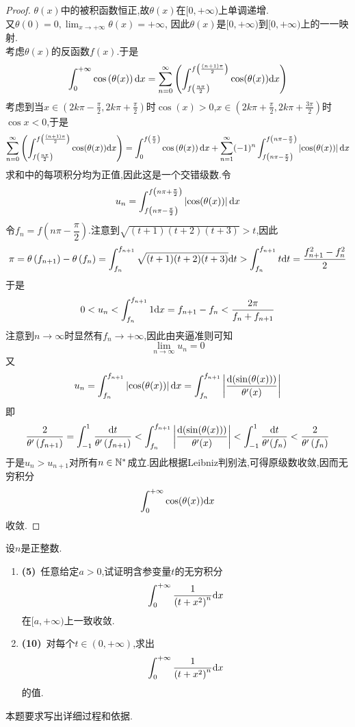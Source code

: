 \documentclass{ctexart}
\begin{document}
\begin{proof}
    $\theta(x)$中的被积函数恒正,故$\theta(x)$在$[0,+\infty)$上单调递增.\\
    又$\theta(0)=0,\displaystyle\lim_{x\to+\infty}\theta(x)=+\infty$,%
    因此$\theta(x)$是$[0,+\infty)$到$[0,+\infty)$上的一一映射.\\
    考虑$\theta(x)$的反函数$f(x)$.于是
    \[\int_0^{+\infty}\cos\left(\theta(x)\right)\mathrm{d} x
    =\sum_{n=0}^{\infty}\left(\int_{f\left(\frac{n\pi}{2}\right)}^{f\left(\frac{(n+1)\pi}{2}\right)}\cos(\theta(x))\mathrm{d} x\right)\]
    考虑到当$x\in\left(2k\pi-\frac\pi2,2k\pi+\frac\pi2\right)$时$\cos(x)>0$,$x\in\left(2k\pi+\frac\pi2,2k\pi+\frac{3\pi}{2}\right)$时$\cos x<0$,于是
    \[\sum_{n=0}^{\infty}\left(\int_{f\left(\frac{n\pi}{2}\right)}^{f\left(\frac{(n+1)\pi}{2}\right)}\cos(\theta(x))\mathrm{d} x\right)
    =\int_0^{f\left(\frac\pi2\right)}\cos\left(\theta(x)\right)\mathrm{d} x
    +\sum_{n=1}^{\infty}(-1)^n\int_{f\left(n\pi-\frac\pi2\right)}^{f\left(n\pi-\frac\pi2\right)}\left|\cos(\theta(x))\right|\mathrm{d} x\]
    求和中的每项积分均为正值,因此这是一个交错级数.令
    \[u_n=\int_{f\left(n\pi-\frac\pi2\right)}^{f\left(n\pi+\frac\pi2\right)}\left|\cos(\theta(x))\right|\mathrm{d} x\]
    令$f_n=f\left(n\pi-\dfrac{\pi}{2}\right)$.注意到$\sqrt{(t+1)(t+2)(t+3)}>t$,因此
    \[\pi=\theta\left(f_{n+1}\right)-\theta\left(f_n\right)=\int_{f_n}^{f_{n+1}}\sqrt{(t+1)(t+2)(t+3)}\mathrm{d} t>\int_{f_n}^{f_{n+1}}t\mathrm{d} t=\dfrac{f_{n+1}^2-f_n^2}{2}\]
    于是
    \[0<u_n<\int_{f_n}^{f_{n+1}}1\mathrm{d} x=f_{n+1}-f_n<\dfrac{2\pi}{f_n+f_{n+1}}\]
    注意到$n\to\infty$时显然有$f_{n}\to+\infty$,因此由夹逼准则可知
    \[\lim_{n\to\infty}u_n=0\]
    又
    \[u_n
    =\int_{f_n}^{f_{n+1}}\left|\cos(\theta(x))\right|\mathrm{d} x
    =\int_{f_n}^{f_{n+1}}\left|\dfrac{\mathrm{d}(\sin(\theta(x)))}{\theta'(x)}\right|\]
    即
    \[\dfrac{2}{\theta'\left(f_{n+1}\right)}=\int_{-1}^{1}\dfrac{\mathrm{d} t}{\theta'\left(f_{n+1}\right)}
    <\int_{f_n}^{f_{n+1}}\left|\dfrac{\mathrm{d}(\sin(\theta(x)))}{\theta'(x)}\right|
    <\int_{-1}^{1}\dfrac{\mathrm{d} t}{\theta'(f_{n})}<\dfrac{2}{\theta'\left(f_n\right)}\]
    于是$u_n>u_{n+1}$对所有$n\in\mathbb{N}^*$成立.因此根据Leibniz判别法,可得原级数收敛,因而无穷积分
    \[\int_0^{+\infty}\cos(\theta(x))\mathrm{d} x\]
    收敛.

\end{proof}
\begin{problem}[8.(15\songti{分})]
    设$n$是正整数.
    \begin{enumerate}[label=\tbf{(\arabic*)},topsep=0pt,parsep=0pt,itemsep=0pt,partopsep=0pt]
        \item \textbf{(5)}\ 任意给定$a>0$,试证明含参变量$t$的无穷积分
            \[\int_0^{+\infty}\dfrac{1}{\left(t+x^2\right)^n}\mathrm{d} x\]
            在$[a,+\infty)$上一致收敛.
        \item \textbf{(10)}\ 对每个$t\in(0,+\infty)$,求出
            \[\int_0^{+\infty}\dfrac{1}{\left(t+x^2\right)^n}\mathrm{d} x\]
            的值.
    \end{enumerate}
    本题要求写出详细过程和依据.
\end{problem}
\end{document}
